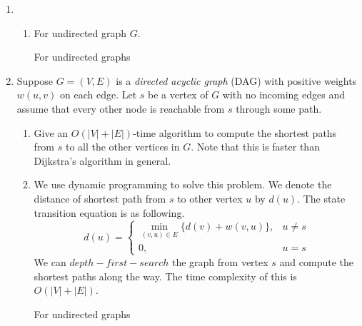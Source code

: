 \documentclass[12pt,a4paper]{article}
\makeatletter
\newtheorem*{solution}{Solution}
\theoremstyle{definition}
\renewenvironment{solution}[1][Solution] {\par\pushQED{\qed}\normalfont\topsep6\p@\@plus6\p@\relax\trivlist\item[\hskip\labelsep\bfseries#1\@addpunct{.}]\ignorespaces}{\popQED\endtrivlist\@endpefalse} \makeatother
\makeatother
\begin{document}
\begin{enumerate}
\begin{solution}
\begin{enumerate}
	\item For undirected graph $G$.
	
	\begin{minipage}{0.9\textwidth}
		\begin{algorithm}[H]
			\BlankLine
			\caption{For undirected graphs}
			\BlankLine
			
		\end{algorithm}
	\end{minipage}
\end{enumerate}
\end{solution}

\item
Suppose $G=(V, E)$ is a \emph{directed acyclic graph} (DAG) with positive weights $w(u, v)$ on each edge. Let $s$ be a vertex of $G$ with no incoming edges and assume that every other node is reachable from $s$ through some path.

\begin{enumerate}
\item
Give an $O(|V|+|E|)$-time algorithm to compute the shortest paths from $s$ to all the other vertices in $G$. Note that this is faster than Dijkstra's algorithm in general.
\begin{solution}
	We use dynamic programming to solve this problem. We denote the distance of shortest path from $s$ to other vertex $u$ by $d(u)$. The state transition equation is as following.
	$$
	d(u)=\begin{cases}
	     \min\limits_{(v,u)\in E}\{d(v)+w(v,u)\},&u\neq s\\
	     0,                                      &u=s
	     \end{cases}
	$$
	We can $depth-first-search$ the graph from vertex $s$ and compute the shortest paths along the way. The time complexity of this is $O(|V|+|E|)$.
	
	\begin{minipage}{0.9\textwidth}
		\begin{algorithm}[H]
			\BlankLine
			\caption{For undirected graphs}
			\BlankLine
			

\end{algorithm}
\end{minipage}
\end{solution}
\end{enumerate}
\end{enumerate}
\end{document}
